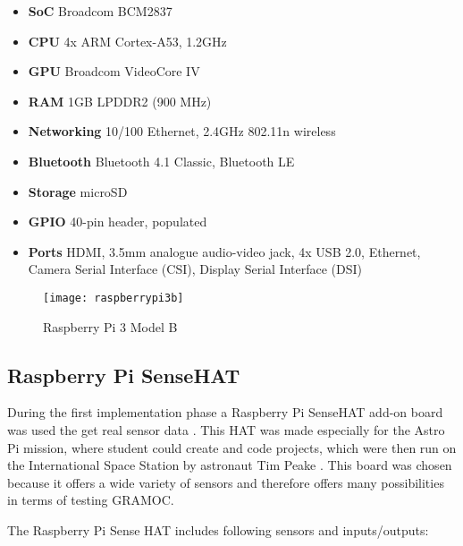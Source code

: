 \begin{itemize}
	\item \textbf{SoC} Broadcom BCM2837
	\item \textbf{CPU} 4x ARM Cortex-A53, 1.2GHz
	\item \textbf{GPU} Broadcom VideoCore IV
	\item \textbf{RAM} 1GB LPDDR2 (900 MHz)
	\item \textbf{Networking} 10/100 Ethernet, 2.4GHz 802.11n wireless
	\item \textbf{Bluetooth} Bluetooth 4.1 Classic, Bluetooth LE
	\item \textbf{Storage} microSD
	\item \textbf{GPIO} 40-pin header, populated
	\item \textbf{Ports} HDMI, 3.5mm analogue audio-video jack, 4x USB 2.0, Ethernet, Camera Serial Interface (CSI), Display Serial Interface (DSI)
\end{itemize}

\begin{figure}[H]
	\centering
	\texttt{[image: raspberrypi3b]}
	\caption{Raspberry Pi 3 Model B}
	\label{fig:raspberrypi3b}
\end{figure}

\subsection{Raspberry Pi SenseHAT}
During the first implementation phase a Raspberry Pi SenseHAT add-on board was used the get real sensor data \cite{SenseHAT}. This HAT was made especially for the Astro Pi mission, where student could create and code projects, which were then run on the International Space Station by astronaut Tim Peake \cite{AstroPiMission}. This board was chosen because it offers a wide variety of sensors and therefore offers many possibilities in terms of testing GRAMOC.

The Raspberry Pi Sense HAT includes following sensors and inputs/outputs:

